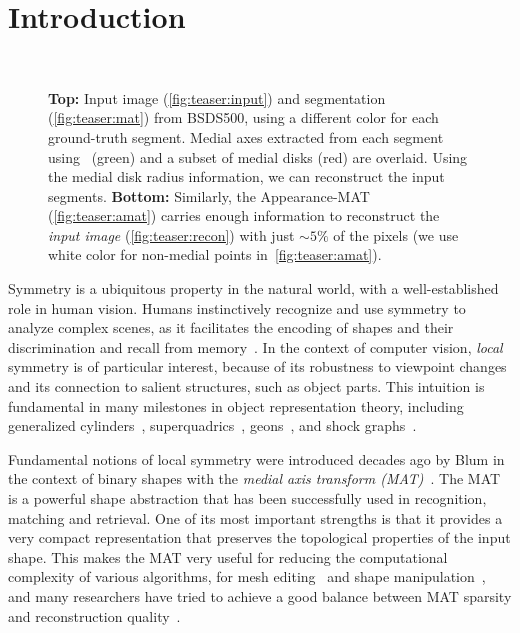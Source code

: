 \documentclass[10pt,twocolumn,letterpaper]{article}
\begin{document}
\section{Introduction}\label{sec:introduction}
\begin{figure}[!t]
\centering
{}
 \\
\caption{\textbf{Top:} Input image (\ref{fig:teaser:input}) and segmentation (\ref{fig:teaser:mat}) from BSDS500,
using a different color for each ground-truth segment. 
Medial axes extracted from each segment using~\cite{telea2002augmented} (green) and a subset of medial disks (red) are overlaid. 
Using the medial disk radius information, we can reconstruct the input segments. 
\textbf{Bottom:} Similarly, the Appearance-MAT (\ref{fig:teaser:amat}) carries enough information to reconstruct the 
 \emph{input image} (\ref{fig:teaser:recon}) with just $\sim 5\%$ of the pixels 
 (we use white color for non-medial points in~\ref{fig:teaser:amat}).}
\label{fig:teaser}
\end{figure}

Symmetry is a ubiquitous property in the natural world, with a well-established role in human vision.
Humans instinctively recognize and use symmetry to analyze complex scenes, as it facilitates the encoding of shapes and
their discrimination and recall from memory~\cite{barlow1979versatility,royer1981detection,wagemans1998parallel}.
In the context of computer vision, \emph{local} symmetry is of particular interest, 
because of its robustness to viewpoint changes and its connection to salient structures, such as object parts.
This intuition is fundamental in many milestones in object representation theory, including generalized
cylinders~\cite{binford1971visual}, superquadrics~\cite{barr1981superquadrics}, 
geons~\cite{biederman1987recognition}, and shock graphs~\cite{siddiqi1999shock}.

Fundamental notions of local symmetry were introduced decades ago by Blum in the context 
of binary shapes with the \emph{medial axis transform (MAT)}~\cite{blum1967transformation,blum1973biological}.
The MAT is a powerful shape abstraction that has been successfully used in recognition, matching and retrieval. 
One of its most important strengths is that it provides a very compact representation that preserves the topological
properties of the input shape.
This makes the MAT very useful for reducing the computational complexity of various algorithms,
\eg for mesh editing~\cite{li2001decomposing,yoshizawa2003free} and shape manipulation~\cite{du2004medial},
and many researchers have tried to achieve a good balance
between MAT sparsity and reconstruction quality~\cite{tam2003shape,li2015q}.
\end{document}
